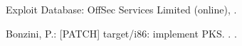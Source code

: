 \documentclass[english,preprint,JIP]{ipsj}
\begin{document}
\begin{thebibliography}{99}



Exploit Database: OffSec Services Limited (online),
 .

  
    Bonzini, P.: [PATCH] target/i86: implement PKS. . .


\end{thebibliography}
\end{document}
